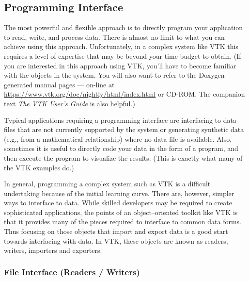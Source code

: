 \subsection{Programming Interface}
\label{subsec:programming_interface}

The most powerful and flexible approach is to directly program your application to read, write, and process data. There is almost no limit to what you can achieve using this approach. Unfortunately, in a complex system like VTK this requires a level of expertise that may be beyond your time budget to obtain. (If you are interested in this approach using VTK, you'll have to become familiar with the objects in the system. You will also want to refer to the Doxygen-generated manual pages --- on-line at \href{https://www.vtk.org/doc/nightly/html/index.html}{https://www.vtk.org/doc/nightly/html/index.html} or CD-ROM. The companion text \emph{The VTK User's Guide} is also helpful.)

Typical applications requiring a programming interface are interfacing to data files that are not currently supported by the system or generating synthetic data (e.g., from a mathematical relationship) where no data file is available. Also, sometimes it is useful to directly code your data in the form of a program, and then execute the program to visualize the results. (This is exactly what many of the VTK examples do.)

In general, programming a complex system such as VTK is a difficult undertaking because of the initial learning curve. There are, however, simpler ways to interface to data. While skilled developers may be required to create sophisticated applications, the points of an object--oriented toolkit like VTK is that it provides many of the pieces required to interface to common data forms. Thus focusing on those objects that import and export data is a good start towards interfacing with data. In VTK, these objects are known as readers, writers, importers and exporters.

\subsubsection{File Interface (Readers / Writers)}
\label{subsubsec:file_interface_readers_writers}

